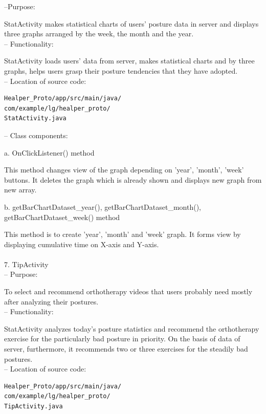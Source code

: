 \documentclass[conference]{IEEEtran}
\begin{document}
 --Purpose:

StatActivity makes statistical charts of users' posture data in server and displays three graphs arranged by the week, the month and the year. \\

 --	Functionality:

StatActivity loads users' data from server, makes statistical charts and by three graphs, helps users grasp their posture tendencies that they have adopted. \\

 --	Location of source code:
 
\begin{verbatim}
Healper_Proto/app/src/main/java/
com/example/lg/healper_proto/
StatActivity.java
 \end{verbatim}
 
 --	Class components:
 
a. OnClickListener() method

This method changes view of the graph depending on 'year', 'month', 'week' buttons. It deletes the graph which is already shown and displays new graph from new array.

b. getBarChartDataset\_{}year(), getBarChartDataset\_{}month(), getBarChartDataset\_{}week() method

This method is to create 'year', 'month' and 'week' graph. It forms view by displaying cumulative time on X-axis and Y-axis.\\\\

7.	TipActivity\\

 --	Purpose:

To select and recommend orthotherapy videos that users probably need mostly after analyzing their postures. \\

 --	Functionality:

StatActivity analyzes today's posture statistics and recommend the orthotherapy exercise for the particularly bad posture in priority. On the basis of data of server, furthermore, it recommends two or three exercises for the steadily bad postures. \\

 --	Location of source code:
 
\begin{verbatim} 
Healper_Proto/app/src/main/java/
com/example/lg/healper_proto/
TipActivity.java
\end{verbatim}
\end{document}
